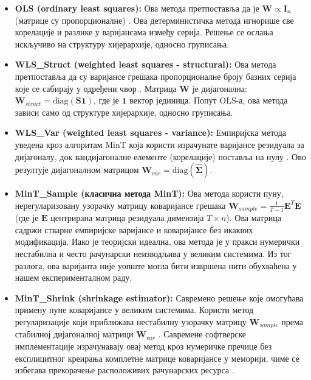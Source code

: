 \documentclass[12pt,oneside]{memoir}
\begin{document}
\begin{itemize}
    \item \textbf{OLS (ordinary least squares):} Ова метода претпоставља да је $\mathbf{W} \propto \mathbf{I}_n$ (матрице су пропорционалне) \cite{hyndman2011optimal}. Ова детерминистичка метода игнорише све корелације и разлике у варијансама између серија. Решење се ослања искључиво на структуру хијерархије, односно груписања.
    \item \textbf{WLS\_Struct (weighted least squares - structural):} Ова метода претпоставља да су варијансе грешака пропорционалне броју базних серија које се сабирају у одређени чвор \cite{hyndman2011optimal}. Матрица $\mathbf{W}$ је дијагонална: $\mathbf{W}_{struct} = \text{diag}(\mathbf{S} \mathbf{1})$, где је $\mathbf{1}$ вектор јединица. Попут OLS-а, ова метода зависи само од структуре хијерархије, односно груписања.
    
    \item \textbf{WLS\_Var (weighted least squares - variance):} Емпиријска метода уведена кроз алгоритам MinT која користи израчунате варијансе резидуала за дијагоналу, док вандијагоналне елементе (корелације) поставља на нулу \cite{wickramasuriya2019optimal}. Ово резултује дијагоналном матрицом $\mathbf{W}_{var} = \text{diag}(\hat{\mathbf{\Sigma}})$.
    
    \item \textbf{MinT\_Sample (класична метода MinT):} Ова метода користи пуну, нерегуларизовану узорачку матрицу коваријансе грешака $\mathbf{W}_{sample} = \frac{1}{T-1}\mathbf{E}^T\mathbf{E}$ (где је $\mathbf{E}$ центрирана матрица резидуала димензија $T \times n$). Ова матрица садржи стварне емпиријске варијансе и коваријансе без икаквих модификација. Иако је теоријски идеална, ова метода је у пракси нумерички нестабилна и често рачунарски неизводљива у великим системима. Из тог разлога, ова варијанта није уопште могла бити извршена нити обухваћена у нашем експерименталном раду.

    \item \textbf{MinT\_Shrink (shrinkage estimator):} Савремено решење које омогућава примену пуне коваријансе у великим системима. Користи метод регуларизације који приближава нестабилну узорачку матрицу $\mathbf{W}_{sample}$ према стабилној дијагоналној матрици $\mathbf{W}_{var}$ \cite{schafer2005shrinkage}. Савремене софтверске имплементације израчунавају овај метод кроз нумеричке пречице без експлицитног креирања комплетне матрице коваријансе у меморији, чиме се избегава прекорачење расположивих рачунарских ресурса \cite{olivares2022hierarchicalforecast}.
\end{itemize}
\end{document}
